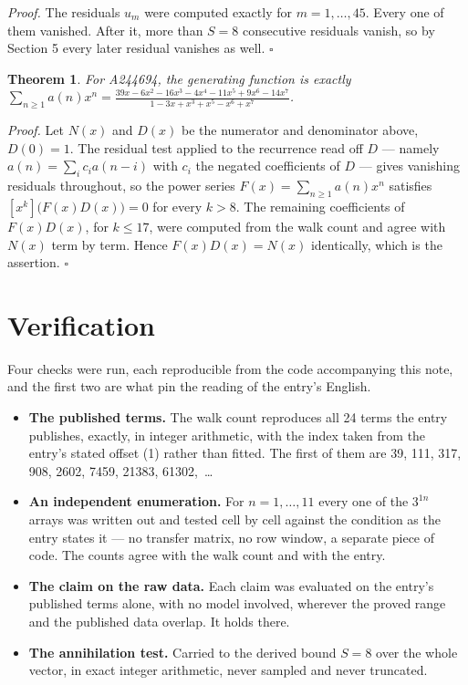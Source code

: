 \documentclass[11pt]{article}
\newtheorem{theorem}{Theorem}
\theoremstyle{definition}
\begin{document}
{\itshape Proof.} The residuals $u_m$ were computed exactly for $m = 1,\dots,45$. Every one of them vanished. After it, more than $S = 8$ consecutive residuals vanish, so by Section 5 every later residual vanishes as well. $\square$

\begin{theorem} For A244694, the generating function is exactly $\sum_{n\ge 1} a(n)x^n = \frac{39x - 6x^{2} - 16x^{3} - 4x^{4} - 11x^{5} + 9x^{6} - 14x^{7}}{1 - 3x + x^{3} + x^{5} - x^{6} + x^{7}}$.\end{theorem}

{\itshape Proof.} Let $N(x)$ and $D(x)$ be the numerator and denominator above, $D(0)=1$. The residual test applied to the recurrence read off $D$ --- namely $a(n) = \sum_i c_i a(n-i)$ with $c_i$ the negated coefficients of $D$ --- gives vanishing residuals throughout, so the power series $F(x)=\sum_{n\ge 1}a(n)x^n$ satisfies $[x^k]\bigl(F(x)D(x)\bigr) = 0$ for every $k > 8$. The remaining coefficients of $F(x)D(x)$, for $k \le 17$, were computed from the walk count and agree with $N(x)$ term by term. Hence $F(x)D(x) = N(x)$ identically, which is the assertion. $\square$

\section{Verification}

Four checks were run, each reproducible from the code accompanying this note, and the first two are what pin the reading of the entry's English.

\begin{itemize}

\item {\bfseries The published terms.} The walk count reproduces all 24 terms the entry publishes, exactly, in integer arithmetic, with the index taken from the entry's stated offset (1) rather than fitted. The first of them are 39, 111, 317, 908, 2602, 7459, 21383, 61302,~\dots

\item {\bfseries An independent enumeration.} For $n = 1,\dots,11$ every one of the $3^{1n}$ arrays was written out and tested cell by cell against the condition as the entry states it --- no transfer matrix, no row window, a separate piece of code. The counts agree with the walk count and with the entry.

\item {\bfseries The claim on the raw data.} Each claim was evaluated on the entry's published terms alone, with no model involved, wherever the proved range and the published data overlap. It holds there.

\item {\bfseries The annihilation test.} Carried to the derived bound $S = 8$ over the whole vector, in exact integer arithmetic, never sampled and never truncated.

\end{itemize}
\end{document}
